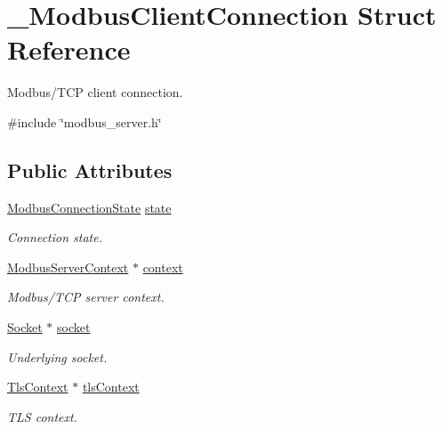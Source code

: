 \hypertarget{struct__ModbusClientConnection}{}\section{\+\_\+\+Modbus\+Client\+Connection Struct Reference}
\label{struct__ModbusClientConnection}


Modbus/\+T\+CP client connection.  




{\ttfamily \#include \char`\"{}modbus\+\_\+server.\+h\char`\"{}}

\subsection*{Public Attributes}
\begin{DoxyCompactItemize}
\item 
\hyperlink{modbus__server_8h_a833fbe8b8a0937e5fd644bcad5b11fbc}{Modbus\+Connection\+State} \hyperlink{struct__ModbusClientConnection_aaee0172f0c630ce661ebf5c3d2633a91}{state}
\begin{DoxyCompactList}\small\item\em Connection state. \end{DoxyCompactList}\item 
\hyperlink{modbus__server_8h_a3a5f2957951349d3c053b1ebe94fe4f7}{Modbus\+Server\+Context} $\ast$ \hyperlink{struct__ModbusClientConnection_a4ab59255dccf72dd5fea9b2567260194}{context}
\begin{DoxyCompactList}\small\item\em Modbus/\+T\+CP server context. \end{DoxyCompactList}\item 
\hyperlink{socket_8h_aa85acfb0fa336ef495e6ba87fb88fc48}{Socket} $\ast$ \hyperlink{struct__ModbusClientConnection_a4ae661cf03ad2a92cb877128fe48d925}{socket}
\begin{DoxyCompactList}\small\item\em Underlying socket. \end{DoxyCompactList}\item 
\hyperlink{tls_8h_ac09f7a286c0cdf9b07ee1edd107946f5}{Tls\+Context} $\ast$ \hyperlink{struct__ModbusClientConnection_a39d29258838f9f77d4c05ec9dab225c5}{tls\+Context}
\begin{DoxyCompactList}\small\item\em T\+LS context. \end{DoxyCompactList}\item 

\end{DoxyCompactItemize}
